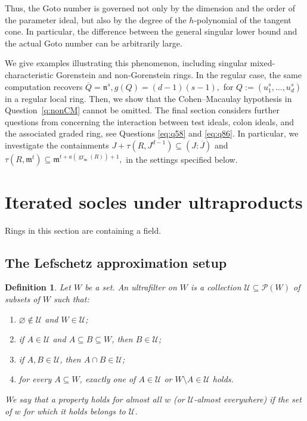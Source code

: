 \documentclass[11pt,a4paper]{amsart}
\numberwithin{equation}{section}
\newtheorem{definition}[theorem]{Definition}
\newcommand{\U}{\mathcal{U}}
\begin{document}
Thus, the Goto number is governed not only by the dimension
and the order of the parameter ideal, but also by the degree
of the $h$-polynomial of the tangent cone. In particular, the
difference between the general singular lower bound and the
actual Goto number can be arbitrarily large.

We give examples illustrating this phenomenon, including
singular mixed-characteristic Gorenstein and non-Gorenstein
rings. In the regular case, the same computation recovers
$\overline Q=\mathfrak n^s,g(Q)=(d-1)(s-1),$
for
$Q:=(u_1^s,\ldots,u_d^s)$
in a regular local ring.
Then, we show that the Cohen--Macaulay hypothesis in
Question~\ref{q:nonCM} cannot be omitted. 
The final section  considers further questions from
\cite{WY}
concerning the interaction between test ideals, colon ideals,
and the associated graded ring, see  {Questions}    \ref{eq:q58} and \ref{eq:q86}. In particular, we investigate
the containments
$ J+\tau(R,J^{d-1})\subseteq (J:\overline J)$ and
$ \tau(R,\mathfrak m^t)
\subseteq \mathfrak m^{t+a(\operatorname{gr}_{\mathfrak m}(R))+1},$
in the settings specified below.



 
 \section{ Iterated socles under ultraproducts}
 
  Rings in this section are containing a field.
 
 \subsection{The Lefschetz approximation setup}
 

 \begin{definition}
 	Let $W$ be a set. An \emph{ultrafilter} on $W$ is a collection
 	$\U\subseteq\mathcal P(W)$ of subsets of $W$ such that:
 	\begin{enumerate}
 		\item $\varnothing\notin\U$ and $W\in\U$;
 		\item if $A\in\U$ and $A\subseteq B\subseteq W$, then $B\in\U$;
 		\item if $A,B\in\U$, then $A\cap B\in\U$;
 		\item for every $A\subseteq W$, exactly one of $A\in\U$ or
 		$W\setminus A\in\U$ holds.
 	\end{enumerate}
 	We say that a property holds \emph{for almost all $w$} (or
 	\emph{$\U$-almost everywhere}) if the set of $w$ for which it holds
 	belongs to $\U$.
 \end{definition}
 
\end{document}

